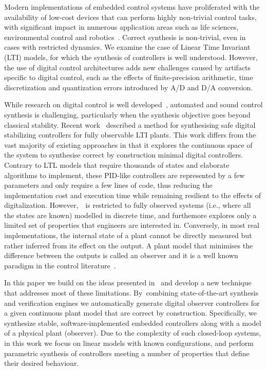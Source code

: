 \documentclass[sigconf]{llncs}
\begin{document}
Modern implementations of embedded control systems have proliferated with
the availability of low-cost devices that can perform highly non-trivial
control tasks, with significant impact in numerous application areas such as
life sciences, environmental control and robotics~\cite{astrom1997computer,Franklin15}.  Correct synthesis is non-trivial, even in cases with
restricted dynamics.  We examine the case of Linear Time Invariant (LTI)
models, for which the synthesis of controllers is well understood.  However,
the use of digital control architectures adds new challenges caused by
artifacts specific to digital control, such as the effects of
finite-precision arithmetic, time discretization and quantization errors
introduced by A/D and D/A conversion.

While research on digital control is well
developed~\cite{astrom1997computer}, automated and sound control synthesis
is challenging, particularly when the synthesis objective goes beyond
classical stability.  Recent work~\cite{abate2017automated} described a
method for synthesising safe digital stabilizing controllers for fully
observable LTI plants.  This work differs from the vast majority of existing
approaches in that it explores the continuous space of the system to
synthesise correct by construction minimal digital controllers.  Contrary to
LTL models  that require thousands of states and elaborate algorithms to
implement, these PID-like controllers are represented by a few parameters
and only require a few lines of code, thus reducing the implementation cost
and execution time while remaining resilient to the effects of digitalization.
However,~\cite{abate2017automated}~is restricted to fully observed
systems (i.e., where all the states are known) modelled in discrete time,
and furthemore explores only a limited set of properties that engineers
are interested in. Conversely, 
in most real implementations, the internal state of a plant cannot be
directly measured but rather inferred from its
effect on the output. A plant model that minimises the difference
between the outputs is called an observer and it is a well known
paradigm in the control literature~\cite{astrom1997computer}.


In this paper we build on the ideas presented in~\cite{abate2017automated}
and develop a new technique that addresses most of these limitations. 
By~combining state-of-the-art synthesis and verification engines we
automatically generate digital observer controllers for a given continuous
plant model that are correct by construction.  %
Specifically, we synthesize stable,
software-implemented embedded controllers along with a model of a physical
plant (observer).  Due to the complexity of such closed-loop systems, in
this work we focus on linear models with known configurations, and perform
parametric synthesis of controllers meeting a number of properties that
define their desired behaviour.
\end{document}
